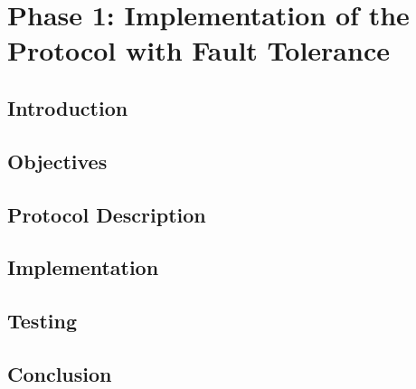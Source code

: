 \chapter{Phase 1: Implementation of the Protocol with Fault Tolerance}

\section{Introduction}

\section{Objectives}

\section{Protocol Description}

\section{Implementation}

\section{Testing}

\section{Conclusion}

